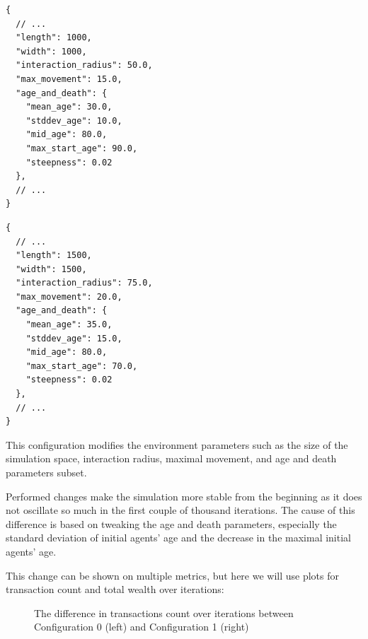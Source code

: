 \documentclass[english]{projectreport}
\begin{document}
\begin{minipage}{0.48\textwidth}
\begin{verbatim}
{
  // ...
  "length": 1000,
  "width": 1000,
  "interaction_radius": 50.0,
  "max_movement": 15.0,
  "age_and_death": {
    "mean_age": 30.0,
    "stddev_age": 10.0,
    "mid_age": 80.0,
    "max_start_age": 90.0,
    "steepness": 0.02
  },
  // ...
}
\end{verbatim}
\end{minipage}
\hfill
\begin{minipage}{0.48\textwidth}
\begin{verbatim}
{
  // ...
  "length": 1500,
  "width": 1500,
  "interaction_radius": 75.0,
  "max_movement": 20.0,
  "age_and_death": {
    "mean_age": 35.0,
    "stddev_age": 15.0,
    "mid_age": 80.0,
    "max_start_age": 70.0,
    "steepness": 0.02
  },
  // ...
}
\end{verbatim}
\end{minipage}

    This configuration modifies the environment parameters such as the size of the simulation space, interaction radius, maximal movement, and age and death parameters subset.

    Performed changes make the simulation more stable from the beginning as it does not oscillate so much in the first couple of thousand iterations. The cause of this difference is based on tweaking the age and death parameters, especially the standard deviation of initial agents' age and the decrease in the maximal initial agents' age.

    This change can be shown on multiple metrics, but here we will use plots for transaction count and total wealth over iterations:

\begin{figure}[H]
\begin{center}
%
\label{fig:c1-total_transactions_count}
\end{center}
\caption{The difference in transactions count over iterations between Configuration 0 (left) and Configuration 1 (right)}
\end{figure}
\end{document}
